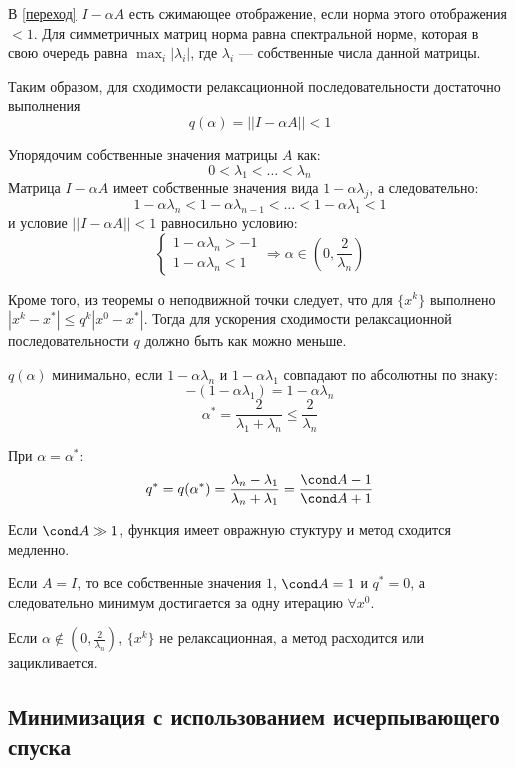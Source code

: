 В \eqref{переход} \(I - \alpha A\) есть сжимающее отображение, если норма этого отображения \( < 1\). Для симметричных матриц норма равна спектральной норме, которая в свою очередь равна \(\max_{i} |\lambda_i|\), где \(\lambda_i\) --- собственные числа данной матрицы.

Таким образом, для сходимости релаксационной последовательности достаточно выполнения
\[q(\alpha) = ||I - \alpha A|| < 1\]

Упорядочим собственные значения матрицы \(A\) как:
\[0 < \lambda_1 < \dots < \lambda_n\]
Матрица \(I - \alpha A\) имеет собственные значения вида \(1 - \alpha \lambda_j\), а следовательно:
\[1 - \alpha \lambda_n < 1 - \alpha \lambda_{n - 1} < \dots < 1 - \alpha \lambda_1 < 1\]
и условие \(||I - \alpha A|| < 1\) равносильно условию:
\[\begin{cases}
        1 - \alpha \lambda_n > - 1 \\
        1 - \alpha \lambda_n < 1
    \end{cases}
    \Rightarrow \alpha \in \left( 0, \frac{2}{\lambda_n} \right)\]

Кроме того, из теоремы о неподвижной точки следует, что для \(\{x^k\}\) выполнено \(|x^k - x^*| \leq q^k |x^0 - x^*|\). Тогда для ускорения сходимости релаксационной последовательности \(q\) должно быть как можно меньше.

\(q(\alpha)\) минимально, если \(1 - \alpha \lambda_n\) и \(1 - \alpha \lambda_1\) совпадают по абсолютны по знаку:
\[ - (1 - \alpha \lambda_1) = 1 - \alpha \lambda_n\]
\[\alpha^* = \frac{2}{\lambda_1 + \lambda_n} \leq \frac{2}{\lambda_n}\]

При \(\alpha = \alpha^*\):
\begin{equation}
    q^* = q(\alpha^*) = \frac{\lambda_n - \lambda_1}{\lambda_n + \lambda_1} = \frac{\cond A - 1}{\cond A + 1}
    \label{q*}
\end{equation}

Если \(\cond A \gg 1\), функция имеет овражную стуктуру и метод сходится медленно.

Если \(A = I\), то все собственные значения \(1\), \(\cond A = 1\) и \(q^* = 0\), а следовательно минимум достигается за одну итерацию \(\forall x^0\).

Если \(\alpha \notin \left( 0, \frac{2}{\lambda_n} \right)\), \(\{x^k\}\) не релаксационная, а метод расходится или зацикливается.

\subsection{Минимизация с использованием исчерпывающего спуска}

